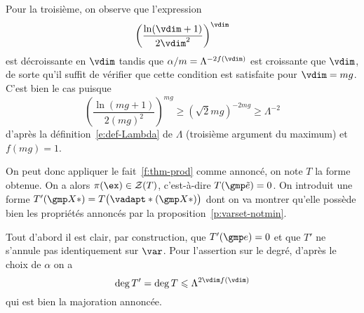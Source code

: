 Pour la troisième, on observe que l'expression
\begin{equation}
  \left( \frac{\ln(\vdim+1)}{2\vdim^2}\right)^\vdim
\end{equation}
est décroissante en \( \vdim \) tandis que \( \alpha / m =
  \Lambda^{-2f(\vdim)} \) est croissante que \( \vdim \), de sorte qu'il
suffit de vérifier que cette condition est satisfaite pour \( \vdim =
  mg \). C'est bien le cas puisque
\begin{equation} \label{e:tp-3}
  \left( \frac{\ln(mg + 1)}{2(mg)^2}\right)^{mg}
  \ge
  (\sqrt2 mg)^{-2mg}
  \ge
  \Lambda^{-2}
\end{equation}
d'après la définition~\eqref{e:def-Lambda} de \( \Lambda \) (troisième
argument du maximum) et \( f(mg) = 1 \).

On peut donc appliquer le fait~\vref{f:thm-prod} comme annoncé, on note \( T \)
la forme obtenue. On a alors \( \pi(\ex) \in \zeros T \), c'est-à-dire \(
  T(\cexa) = 0 \). On introduit une forme \( T'(\vmp*) = T\bigl(
    \vadapt*(\vmp*) \bigr) \) dont on va montrer qu'elle possède bien
les propriétés annoncés par la proposition~\vref{p:varset-notmin}.

Tout d'abord il est clair, par construction, que \( T'(\cex) = 0 \) et que \(
  T' \) ne s'annule pas identiquement sur \( \var \). Pour l'assertion sur le
degré, d'après le choix de \( \alpha \) on a
\begin{equation}
  \deg T' = \deg T \le \Lambda^{2\vdim f(\vdim)}
\end{equation}
qui est bien la majoration annoncée.

